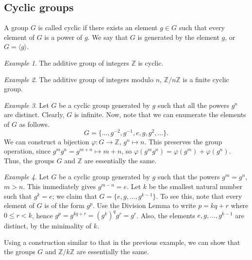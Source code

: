 \documentclass[11pt]{article}
\newcommand{\Z}{\mathbb{Z}}
\theoremstyle{definition}
\theoremstyle{remark}
\newtheorem*{example}{Example}
\numberwithin{equation}{section}
\begin{document}
    \subsection{Cyclic groups}
    \begin{definition}
        A group $G$ is called cyclic if there exists an element $g \in G$ such that
        every element of $G$ is a power of $g$. We say that $G$ is generated by the
        element $g$, or $G = \langle g\rangle$.
    \end{definition}
    \begin{example}
        The additive group of integers $\Z$ is cyclic.
    \end{example}
    \begin{example}
        The additive group of integers modulo $n$, $\Z / n\Z$ is a finite cyclic group.
    \end{example}
    \begin{example}
        Let $G$ be a cyclic group generated by $g$ such that all the powers $g^n$ are
        distinct. Clearly, $G$ is infinite. Now, note that we can enumerate the
        elements of $G$ as follows. \[
            G = \{\dots, g^{-2}, g^{-1}, e, g, g^2, \dots\}.
        \] We can construct a bijection $\varphi\colon G \to \Z$, $g^n \mapsto n$.
        This preserves the group operation, since $g^{m}g^{n} = g^{m + n} \mapsto m +
        n$, so $\varphi(g^m g^n) = \varphi(g^m) + \varphi(g^n)$. Thus, the groups $G$
        and $\Z$ are essentially the same.
    \end{example}
    \begin{example}
        Let $G$ be a cyclic group generated by $g$ such that the powers $g^m = g^n$,
        $m > n$. This immediately gives $g^{m - n} = e$. Let $k$ be the smallest
        natural number such that $g^k = e$; we claim that $G = \{e, g, \dots, g^{k -
        1}\}$. To see this, note that every element of $G$ is of the form $g^p$. Use
        the Division Lemma to write $p = kq + r$ where $0 \leq r < k$, hence $g^p =
        g^{kq + r} = (g^k)^q g^r = g^r$. Also, the elements $e, g, \dots, g^{k - 1}$
        are distinct, by the minimality of $k$.

        Using a construction similar to that in the previous example, we can show
        that the groups $G$ and $\Z/k\Z$ are essentially the same.
    \end{example}
\end{document}

